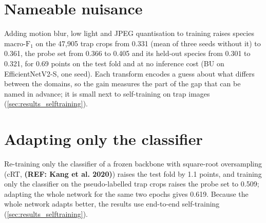 \section{Nameable nuisance}\label{appendix:nuisance}
Adding motion blur, low light and JPEG quantisation to training raises species macro-$\text{F}_1$ on the 47,905 trap crops from 0.331 (mean of three seeds without it) to 0.361, the probe set from 0.366 to 0.405 and its held-out species from 0.301 to 0.321, for 0.69 points on the test fold and at no inference cost (BU on EfficientNetV2-S, one seed).
Each transform encodes a guess about what differs between the domains, so the gain measures the part of the gap that can be named in advance; it is small next to self-training on trap images (\cref{sec:results_selftraining}).

\section{Adapting only the classifier}\label{appendix:classifier}
Re-training only the classifier of a frozen backbone with square-root oversampling (cRT, \textbf{(REF: Kang et al. 2020)}) raises the test fold by 1.1 points, and training only the classifier on the pseudo-labelled trap crops raises the probe set to 0.509; adapting the whole network for the same two epochs gives 0.619.
Because the whole network adapts better, the results use end-to-end self-training (\cref{sec:results_selftraining}).
